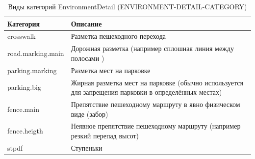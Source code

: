         \begin{center}
          \begin{xltabular}{\linewidth}{|l|X|}
            \caption{Виды категорий EnvironmentDetail (ENVIRONMENT-DETAIL-CATEGORY)}\\           \hline
            Категория         & Описание                                                                                             \\ \hline
            crosswalk         & Разметка пешеходного перехода                                                                        \\ \hline
            road.marking.main & Дорожная разметка (например сплошная линия между полосами )                                          \\ \hline
            parking.marking   & Разметка мест на парковке                                                                            \\ \hline
            parking.big       & Жирная разметка мест на парковке (обычно используется для запрещения парковки в определённых местах) \\ \hline
            fence.main        & Препятствие пешеходному маршруту в явно физическом виде (забор)                                      \\ \hline
            fence.heigth      & Неявное препятствие пешеходному маршруту (например резкий перепад высот)                             \\ \hline
            stpdf             & Ступеньки                                                                                            \\ \hline
          \end{xltabular}
        \end{center}

